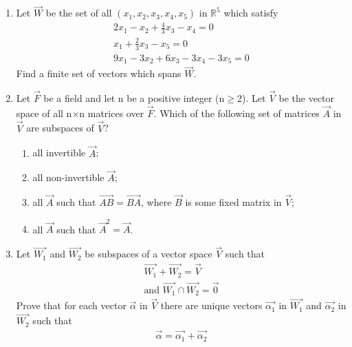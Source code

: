 \renewcommand{\theequation}{\theenumi}
\renewcommand{\thefigure}{\theenumi}
\begin{enumerate}[label=\thesubsection.\arabic*.,ref=\thesubsection.\theenumi]
%
\item  Let $\vec{W}$ be the set of all $(x_1,x_2,x_3,x_4,x_5)$ in $\mathbb{R}^5$ which satisfy
 \begin{align}
 2x_1-x_2+\frac{4}{3}x_3-x_4=0\\x_1+\frac{2}{3}x_3-x_5=0\\9x_1-3x_2+6x_3-3x_4-3x_5=0
 \end{align}
 Find a finite set of vectors which spans $\vec{W}$.

\solution

\item Let $\vec{F}$ be a field and let n be a positive integer (n$\geq$2). Let $\vec{V}$ be the vector space of all n$\times$n matrices over $\vec{F}$. Which of the following set of matrices $\vec{A}$ in $\vec{V}$ are subspaces of   $\vec{V}$?
\begin{enumerate}
\item all invertible $\vec{A}$;
\item all non-invertible $\vec{A}$;
\item all $\vec{A}$ such that $\vec{AB}=\vec{BA}$, where $\vec{B}$ is some fixed matrix in $\vec{V}$;
\item all $\vec{A}$ such that $\vec{A}^2 = \vec{A}$.
\end{enumerate}
%
\solution

\item Let $\vec{W_1}$ and $\vec{W_2}$ be subspaces of a vector space $\vec{V}$ such that 
\begin{align}
   \vec{W_1}+\vec{W_2}=\vec{V} \\
   \text{and  }  \vec{W_1}\cap \vec{W_2}=\vec{0}\label{eq:solutions/2/2/9/1}
\end{align}
Prove that for each vector $\vec{\alpha}$ in $\vec{V}$ there are unique vectors $\vec{\alpha_1}$ in $\vec{W_1}$ and $\vec{\alpha_2}$ in $\vec{W_2}$ such that
\begin{align}
    \vec{\alpha}=\vec{\alpha_1}+\vec{\alpha_2}\label{eq:solutions/2/2/9/2}
\end{align}
%
\\
\solution

%
\end{enumerate}


